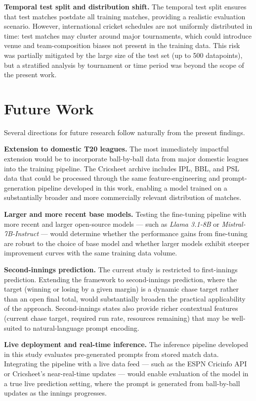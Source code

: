 \textbf{Temporal test split and distribution shift.} The temporal test split ensures that test matches postdate all training matches, providing a realistic evaluation scenario. However, international cricket schedules are not uniformly distributed in time: test matches may cluster around major tournaments, which could introduce venue and team-composition biases not present in the training data. This risk was partially mitigated by the large size of the test set (up to 500 datapoints), but a stratified analysis by tournament or time period was beyond the scope of the present work.

\section{Future Work}

Several directions for future research follow naturally from the present findings.

\textbf{Extension to domestic T20 leagues.} The most immediately impactful extension would be to incorporate ball-by-ball data from major domestic leagues into the training pipeline. The Cricsheet archive includes IPL, BBL, and PSL data that could be processed through the same feature-engineering and prompt-generation pipeline developed in this work, enabling a model trained on a substantially broader and more commercially relevant distribution of matches.

\textbf{Larger and more recent base models.} Testing the fine-tuning pipeline with more recent and larger open-source models --- such as \textit{Llama 3.1-8B} or \textit{Mistral-7B-Instruct} --- would determine whether the performance gains from fine-tuning are robust to the choice of base model and whether larger models exhibit steeper improvement curves with the same training data volume.

\textbf{Second-innings prediction.} The current study is restricted to first-innings prediction. Extending the framework to second-innings prediction, where the target (winning or losing by a given margin) is a dynamic chase target rather than an open final total, would substantially broaden the practical applicability of the approach. Second-innings states also provide richer contextual features (current chase target, required run rate, resources remaining) that may be well-suited to natural-language prompt encoding.

\textbf{Live deployment and real-time inference.} The inference pipeline developed in this study evaluates pre-generated prompts from stored match data. Integrating the pipeline with a live data feed --- such as the ESPN Cricinfo API or Cricsheet's near-real-time updates --- would enable evaluation of the model in a true live prediction setting, where the prompt is generated from ball-by-ball updates as the innings progresses.

